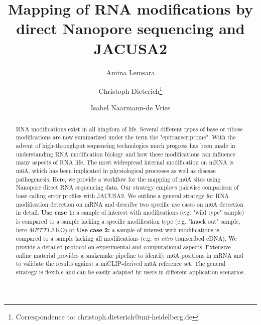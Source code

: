 \documentclass[times, 11pt, a4paper]{article}
\begin{document}
\providecommand{\keywords}[1]{\textbf{Keywords:} #1}

\title{\Large Mapping of RNA modifications by direct Nanopore sequencing and JACUSA2}

\date{}
\author[1,2]{Amina Lemsara}
\author[1,2,3]{Christoph Dieterich\thanks{Correspondence to: christoph.dieterich@uni-heidelberg.de}}
\author[1,2,3]{Isabel Naarmann-de Vries}




\maketitle

\begin{abstract} %
RNA modifications exist in all kingdom of life. Several different types of base or ribose modifications are now summarized under the term the "epitranscriptome". With the advent of high-throughput sequencing technologies much progress has been made in understanding RNA modification biology and how these modifications can influence many aspects of RNA life. The most widespread internal modification on mRNA is m6A, which has been implicated in physiological processes as well as disease pathogenesis. Here, we provide a workflow for the mapping of m6A sites using Nanopore direct RNA sequencing data. Our strategy employs pairwise comparison of base calling error profiles with JACUSA2. We outline a general strategy for RNA modification detection on mRNA and describe two specific use cases on m6A detection in detail. \textbf{Use case 1:} a sample of interest with modifications (e.g. "wild type" sample) is compared to a sample lacking a specific modification type (e.g. "knock out" sample, here \emph{METTL3}-KO) or \textbf{Use case 2:} a sample of interest with modifications is compared to a sample lacking all modifications (e.g. \emph{in vitro} transcribed cDNA). We provide a detailed protocol on experimental and computational aspects. Extensive online material provides a snakemake pipeline to identify m6A positions in mRNA and to validate the results against  a miCLIP-derived m6A reference set. The general strategy is flexible and can be easily adapted by users in different application scenarios. 
\end{abstract}
\clearpage
\end{document}
